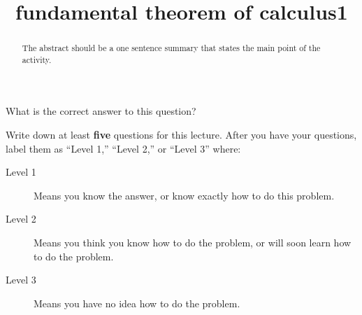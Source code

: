 \documentclass{ximera}
\title{fundamental theorem of calculus1}
\begin{document}
\begin{abstract}
  The abstract should be a one sentence summary that states the main point of the activity.
\end{abstract}

\maketitle

\begin{question}
  What is the correct answer to this question?

  
    \begin{multipleChoice}
    \end{multipleChoice}  
  
\end{question}

Write down at least \textbf{five} questions for this lecture. After
you have your questions, label them as ``Level 1,'' ``Level 2,'' or ``Level 3'' where:
\begin{description}
\item[Level 1] Means you know the answer, or know exactly how to do this problem.
\item[Level 2] Means you think you know how to do the problem, or will soon learn how to do the problem.
\item[Level 3] Means you have no idea how to do the problem. 
\end{description}
\begin{question}
  \begin{freeResponse}
  \end{freeResponse}
\end{question}
\end{document}
